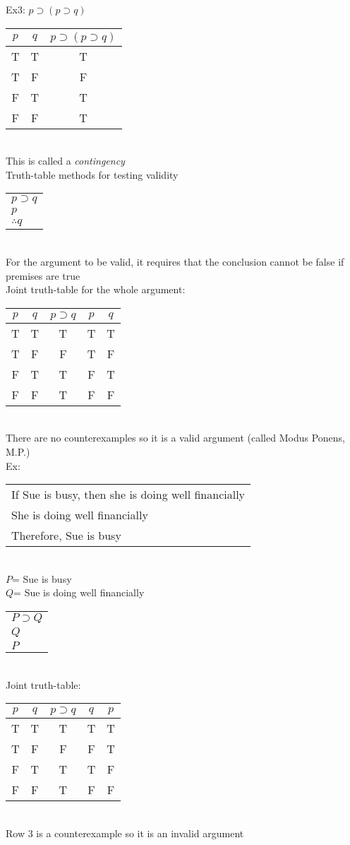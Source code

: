 Ex3: $p\supset(p\supset q)$\\
\begin{tabular}{c|c|c}
    $p$ & $q$ & $p\supset(p\supset q)$\\
    \hline
    T & T & T\\
    T & F & F\\
    F & T & T\\
    F & F & T
\end{tabular}\\
This is called a \textit{contingency}\\

Truth-table methods for testing validity\\
\begin{tabular}{p{2cm}}
    $p\supset q$\\
    $p$\\
    \hline
    $\therefore q$
\end{tabular}\\
For the argument to be valid, it requires that the conclusion cannot be false if premises are true\\
Joint truth-table for the whole argument:\\
\begin{tabular}{c|c||c|c||c}
    $p$ & $q$ & $p\supset q$ & $p$ & $q$\\
    \hline
    T & T & T & T & T\\
    T & F & F & T & F\\
    F & T & T & F & T\\
    F & F & T & F & F
\end{tabular}\\
There are no counterexamples so it is a valid argument (called Modus Ponens, M.P.)\\

Ex:\\
\begin{tabular}{p{8cm}}
    If Sue is busy, then she is doing well financially\\
    She is doing well financially\\
    \hline
    Therefore, Sue is busy
\end{tabular}\\
$P$= Sue is busy\\
$Q$= Sue is doing well financially\\
\begin{tabular}{p{2cm}}
    $P\supset Q$\\
    $Q$\\
    \hline
    $P$
\end{tabular}\\
Joint truth-table:\\
\begin{tabular}{c|c||c|c||c}
    $p$ & $q$ & $p\supset q$ & $q$ & $p$\\
    \hline
    T & T & T & T & T\\
    T & F & F & F & T\\
    F & T & T & T & F\\
    F & F & T & F & F
\end{tabular}\\
Row 3 is a counterexample so it is an invalid argument\\

